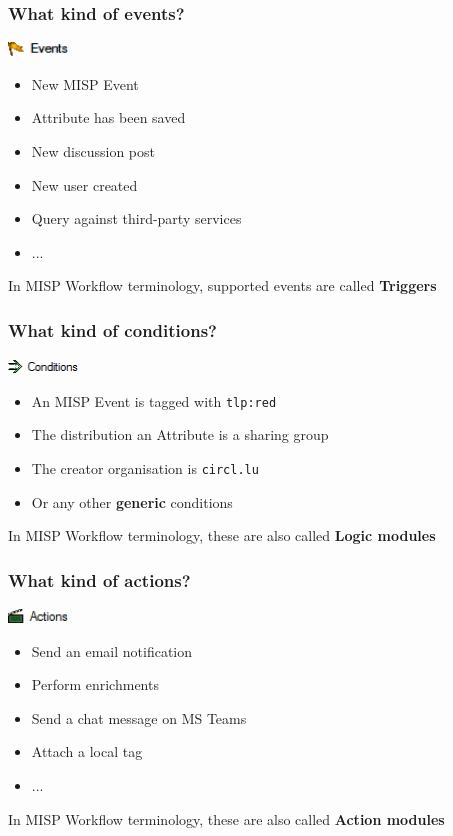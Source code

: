 \begin{frame}
    \frametitle{What kind of events?}
    \includegraphics[width=60px]{pictures/sc-event.png}
    \vspace*{0.5em}
    \begin{itemize}
        \item New MISP Event
        \item Attribute has been saved
        \item New discussion post
        \item New user created
        \item Query against third-party services
        \item ...
    \end{itemize}
    \vspace*{1em}
    In MISP Workflow terminology, supported events are called \textbf{Triggers}
\end{frame}

\begin{frame}
    \frametitle{What kind of conditions?}
    \includegraphics[width=70px]{pictures/sc-condition.png}
    \vspace*{0.5em}
    \begin{itemize}
        \item An MISP Event is tagged with \texttt{tlp:red}
        \item The distribution an Attribute is a sharing group
        \item The creator organisation is \texttt{circl.lu}
        \item Or any other \textbf{generic} conditions
    \end{itemize}

    \vspace*{1em}
    In MISP Workflow terminology, these are also called \textbf{Logic modules}
\end{frame}

\begin{frame}
    \frametitle{What kind of actions?}
    \includegraphics[width=60px]{pictures/sc-action.png}
    \vspace*{0.5em}
    \begin{itemize}
        \item Send an email notification
        \item Perform enrichments
        \item Send a chat message on MS Teams
        \item Attach a local tag
        \item ...
    \end{itemize}

    \vspace*{1em}
    In MISP Workflow terminology, these are also called \textbf{Action modules}
\end{frame}

